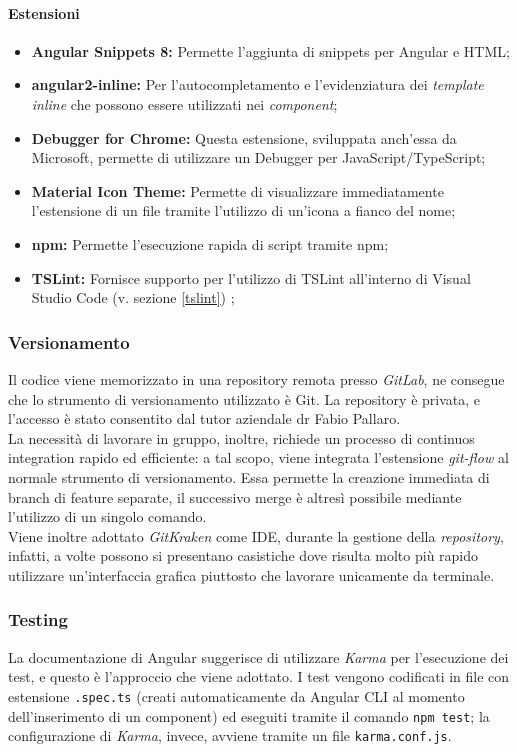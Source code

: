 \paragraph{Estensioni}
\begin{itemize}
	\item \textbf{Angular Snippets 8:} Permette l'aggiunta di \gls{snippets} per Angular e HTML;
	\item \textbf{angular2-inline:} Per l'autocompletamento e l'evidenziatura dei \textit{template inline} che possono essere utilizzati nei \textit{component};
	\item \textbf{Debugger for Chrome:} Questa estensione, sviluppata anch'essa da Microsoft, permette di utilizzare un \gls{Debugger} per JavaScript/TypeScript;
	\item \textbf{Material Icon Theme:} Permette di visualizzare immediatamente l'estensione di un file tramite l'utilizzo di un'icona a fianco del nome;
	\item \textbf{npm:} Permette l'esecuzione rapida di script tramite \gls{npm};
	\item \textbf{TSLint:} Fornisce supporto per l'utilizzo di TSLint all'interno di Visual Studio Code (v. sezione \ref{tslint}) ;
\end{itemize}

\subsubsection{Versionamento}
Il codice viene memorizzato in una \gls{repository} remota presso \textit{GitLab}, ne consegue che lo strumento di versionamento utilizzato è \gls{Git}. La repository è privata, e l'accesso è stato consentito dal tutor aziendale dr Fabio Pallaro.\\
La necessità di lavorare in gruppo, inoltre, richiede un processo di \gls{continuos integration} rapido ed efficiente: a tal scopo, viene integrata l'estensione \textit{git-flow}  al normale strumento di versionamento. Essa permette la creazione immediata di \gls{branch} di feature separate, il successivo \gls{merge} è altresì possibile mediante l'utilizzo di un singolo comando.\\
Viene inoltre adottato \textit{GitKraken} come IDE, durante la gestione della \textit{repository}, infatti, a volte possono si presentano casistiche dove risulta molto più rapido utilizzare un'interfaccia grafica piuttosto che lavorare unicamente da terminale.

\subsubsection{Testing}
La documentazione di Angular suggerisce di utilizzare \textit{Karma} per l'esecuzione dei test, e questo è l'approccio che viene adottato.
I test vengono codificati in file con estensione \texttt{.spec.ts} (creati automaticamente da Angular CLI al momento dell'inserimento di un component) ed eseguiti tramite il comando \texttt{npm test}; la configurazione di \textit{Karma}, invece, avviene tramite un file \texttt{karma.conf.js}.

